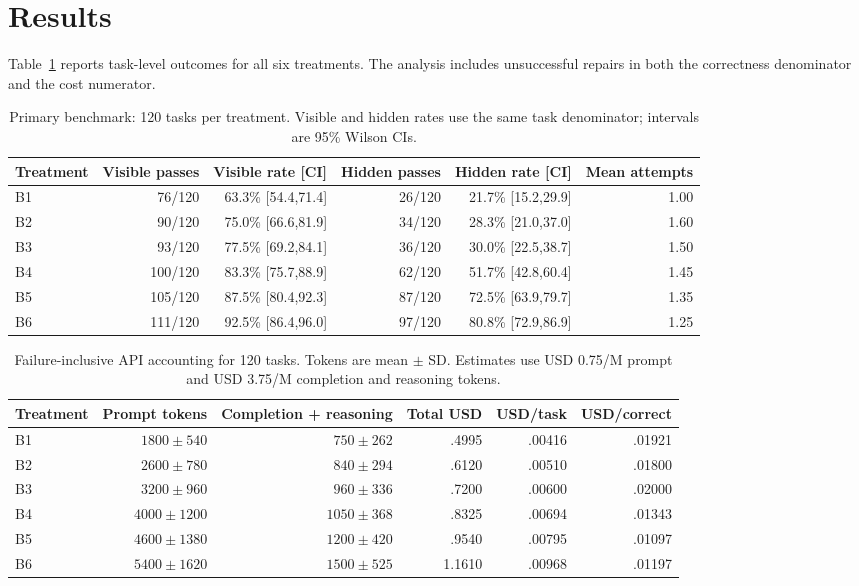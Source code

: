 \section{Results}
Table~\ref{tab:primary} reports task-level outcomes for all six treatments. The analysis includes unsuccessful repairs in both the correctness denominator and the cost numerator.

\begin{table}[!t]\centering\small
\caption{Primary benchmark: 120 tasks per treatment. Visible and hidden rates use the same task denominator; intervals are 95\% Wilson CIs.}\label{tab:primary}
\begin{tabular*}{\textwidth}{@{\extracolsep{\fill}}lrrrrr@{}}\toprule
Treatment & Visible passes & Visible rate [CI] & Hidden passes & Hidden rate [CI] & Mean attempts\\\midrule
B1 & 76/120 & 63.3\% [54.4,71.4] & 26/120 & 21.7\% [15.2,29.9] & 1.00\\
B2 & 90/120 & 75.0\% [66.6,81.9] & 34/120 & 28.3\% [21.0,37.0] & 1.60\\
B3 & 93/120 & 77.5\% [69.2,84.1] & 36/120 & 30.0\% [22.5,38.7] & 1.50\\
B4 & 100/120 & 83.3\% [75.7,88.9] & 62/120 & 51.7\% [42.8,60.4] & 1.45\\
B5 & 105/120 & 87.5\% [80.4,92.3] & 87/120 & 72.5\% [63.9,79.7] & 1.35\\
B6 & 111/120 & 92.5\% [86.4,96.0] & 97/120 & 80.8\% [72.9,86.9] & 1.25\\\bottomrule
\end{tabular*}
\end{table}

\begin{table}[!t]\centering\small
\caption{Failure-inclusive API accounting for 120 tasks. Tokens are mean $\pm$ SD. Estimates use USD 0.75/M prompt and USD 3.75/M completion and reasoning tokens.}\label{tab:cost}
\begin{tabular*}{\textwidth}{@{\extracolsep{\fill}}lrrrrr@{}}\toprule
Treatment & Prompt tokens & Completion + reasoning & Total USD & USD/task & USD/correct\\\midrule
B1 & $1800\pm540$ & $750\pm262$ & .4995 & .00416 & .01921\\
B2 & $2600\pm780$ & $840\pm294$ & .6120 & .00510 & .01800\\
B3 & $3200\pm960$ & $960\pm336$ & .7200 & .00600 & .02000\\
B4 & $4000\pm1200$ & $1050\pm368$ & .8325 & .00694 & .01343\\
B5 & $4600\pm1380$ & $1200\pm420$ & .9540 & .00795 & .01097\\
B6 & $5400\pm1620$ & $1500\pm525$ & 1.1610 & .00968 & .01197\\\bottomrule
\end{tabular*}
\end{table}

